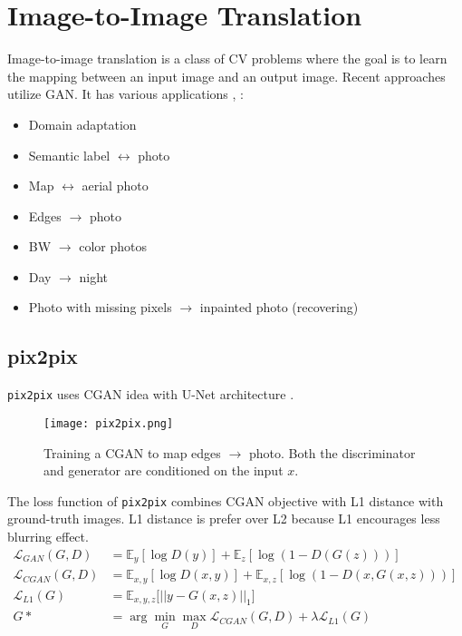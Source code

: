 \section{Image-to-Image Translation}
Image-to-image translation is a class of \ac{CV} problems where the goal is to learn the mapping between an input image and an output image. Recent approaches utilize \ac{GAN}. It has various applications \cite{isola2017image, zhu2017unpaired}, \eg:
\begin{itemize}
	\item Domain adaptation
	\item Semantic label $\leftrightarrow$ photo
	\item Map $\leftrightarrow$ aerial photo
	\item Edges $\rightarrow$ photo
	\item BW $\rightarrow$ color photos
	\item Day $\rightarrow$ night
	\item Photo with missing pixels $\rightarrow$ inpainted photo (recovering)
\end{itemize}

\subsection{pix2pix}
\texttt{pix2pix} uses \ac{CGAN} idea with U-Net architecture \cite{isola2017image}.
\begin{figure}[hbt!]
	\centering
	\texttt{[image: pix2pix.png]}
	\caption{Training a \ac{CGAN} to map edges $\rightarrow$ photo. Both the discriminator and generator are conditioned on the input $x$. \cite{isola2017image}}
\end{figure}

The loss function of \texttt{pix2pix} combines \ac{CGAN} objective with L1 distance with ground-truth images. L1 distance is prefer over L2 because L1 encourages less blurring effect.
\begin{align}
	\mathcal{L}_{GAN}(G,D) &= \mathbb{E}_y [\log D(y)] + \mathbb{E}_z [\log (1-D(G(z)))]\\
	\mathcal{L}_{CGAN}(G,D) &= \mathbb{E}_{x,y} [\log D(x,y)] + \mathbb{E}_{x,z} [\log (1-D(x,G(x,z)))]\\
	\mathcal{L}_{L1}(G) &= \mathbb{E}_{x,y,z} \big[ ||y-G(x,z)||_1 \big]\\
	G* &= \arg \underset{G}{\min} \underset{D}{\max} \mathcal{L}_{CGAN}(G,D) + \lambda \mathcal{L}_{L1}(G)
\end{align}

